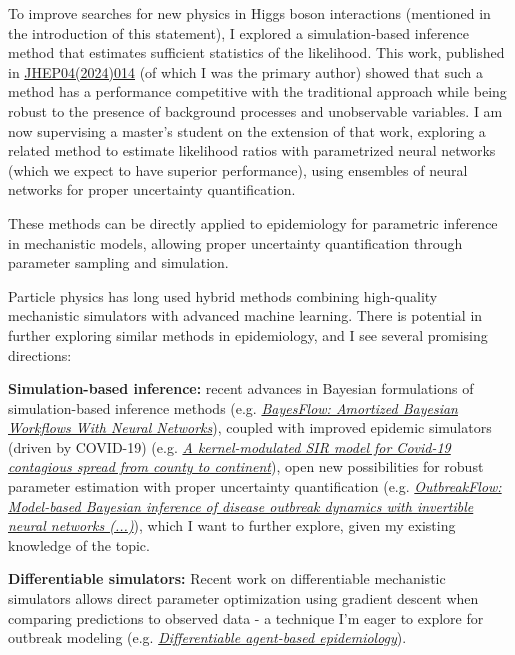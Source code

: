 \documentclass[11pt, a4paper]{awesome-cv}
\begin{document}
\begin{cvletter}
To improve searches for new physics in Higgs boson interactions (mentioned in the introduction of this statement), I explored a simulation-based inference method that estimates sufficient statistics of the likelihood. This work, published in \href{http://dx.doi.org/10.1007/JHEP04(2024)014}{JHEP04(2024)014} (of which I was the primary author) showed that such a method has a performance competitive with the traditional approach while being robust to the presence of background processes and unobservable variables. I am now supervising a master's student on the extension of that work, exploring a related method to estimate likelihood ratios with parametrized neural networks (which we expect to have superior performance), using ensembles of neural networks for proper uncertainty quantification. 

These methods can be directly applied to epidemiology for parametric inference in mechanistic models, allowing proper uncertainty quantification through parameter sampling and simulation.


Particle physics has long used hybrid methods combining high-quality mechanistic simulators with advanced machine learning. There is potential in further exploring similar methods in epidemiology, and I see several promising directions:

\textbf{Simulation-based inference:} recent advances in Bayesian formulations of simulation-based inference methods (e.g. \href{https://arxiv.org/abs/2306.16015}{\textit{BayesFlow: Amortized Bayesian Workflows With Neural Networks}}), coupled with improved epidemic simulators (driven by COVID-19) (e.g. \href{https://pubmed.ncbi.nlm.nih.gov/33958443/}{\textit{A kernel-modulated SIR model for Covid-19 contagious spread from county to continent}}), open new possibilities for robust parameter estimation with proper uncertainty quantification (e.g. \href{https://journals.plos.org/ploscompbiol/article?id=10.1371/journal.pcbi.1009472}{\textit{OutbreakFlow: Model-based Bayesian inference of disease outbreak dynamics with invertible neural networks (...)}}), which I want to further explore, given my existing knowledge of the topic.
  
\textbf{Differentiable simulators:} Recent work on differentiable mechanistic simulators allows direct parameter optimization using gradient descent when comparing predictions to observed data - a technique I'm eager to explore for outbreak modeling (e.g. \href{https://dl.acm.org/doi/abs/10.5555/3545946.3598851}{\textit{Differentiable agent-based epidemiology}}).


\end{cvletter}
\end{document}
